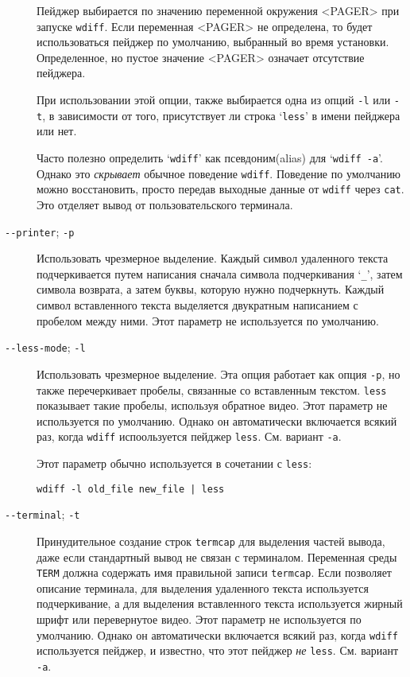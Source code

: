 \begin{description}
Пейджер выбирается по значению переменной окружения
\textless PAGER\textgreater{} при запуске \texttt{wdiff}. Если
переменная \textless PAGER\textgreater{} не определена, то будет
использоваться пейджер по умолчанию, выбранный во время установки.
Определенное, но пустое значение \textless PAGER\textgreater{} означает
отсутствие пейджера.

При использовании этой опции, также выбирается одна из опций \texttt{-l}
или \texttt{-t}, в зависимости от того, присутствует ли строка
`\texttt{less}' в имени пейджера или нет.

Часто полезно определить `\texttt{wdiff}' как псевдоним(alias) для
`\texttt{wdiff
-a}'. Однако это \emph{скрывает} обычное поведение \texttt{wdiff}.
Поведение по умолчанию можно восстановить, просто передав выходные
данные от \texttt{wdiff} через \texttt{cat}. Это отделяет вывод от
пользовательского терминала.
\item[\texttt{-\/-printer}; \texttt{-p}]
Использовать чрезмерное выделение. Каждый символ удаленного текста
подчеркивается путем написания сначала символа подчеркивания
`\texttt{\_}', затем символа возврата, а затем буквы, которую нужно
подчеркнуть. Каждый символ вставленного текста выделяется двукратным
написанием с пробелом между ними. Этот параметр не используется по
умолчанию.
\item[\texttt{-\/-less-mode}; \texttt{-l}]
Использовать чрезмерное выделение. Эта опция работает как опция
\texttt{-p}, но также перечеркивает пробелы, связанные со вставленным
текстом. \texttt{less} показывает такие пробелы, используя обратное
видео. Этот параметр не используется по умолчанию. Однако он
автоматически включается всякий раз, когда \texttt{wdiff} испоользуется
пейджер \texttt{less}. См. вариант \texttt{-a}.

Этот параметр обычно используется в сочетании с \texttt{less}:

\begin{verbatim}
wdiff -l old_file new_file | less
\end{verbatim}
\item[\texttt{-\/-terminal}; \texttt{-t}]
Принудительное создание строк \texttt{termcap} для выделения частей
вывода, даже если стандартный вывод не связан с терминалом. Переменная
среды \texttt{TERM} должна содержать имя правильной записи
\texttt{termcap}. Если позволяет описание терминала, для выделения
удаленного текста используется подчеркивание, а для выделения
вставленного текста используется жирный шрифт или перевернутое видео.
Этот параметр не используется по умолчанию. Однако он автоматически
включается всякий раз, когда \texttt{wdiff} используется пейджер, и
известно, что этот пейджер \emph{не} \texttt{less}. См. вариант
\texttt{-a}.


\end{description}
